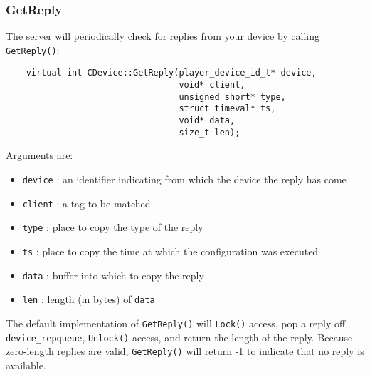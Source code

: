 \documentclass[11pt]{report}
\begin{document}
\subsubsection{GetReply}
The server will periodically check for replies from your device by calling
{\tt GetReply()}:
\begin{verbatim}
    virtual int CDevice::GetReply(player_device_id_t* device, 
                                  void* client, 
                                  unsigned short* type, 
                                  struct timeval* ts, 
                                  void* data, 
                                  size_t len);
\end{verbatim}
Arguments are:
\begin{itemize}
\item {\tt device} : an identifier indicating from which the device the reply
has come
\item {\tt client} : a tag to be matched 
\item {\tt type} : place to copy the type of the reply
\item {\tt ts} : place to copy the time at which the configuration was executed
\item {\tt data} : buffer into which to copy the reply
\item {\tt len} : length (in bytes) of {\tt data}
\end{itemize}
The default implementation of {\tt GetReply()} will {\tt Lock()} access,
pop a reply off {\tt device\_repqueue}, {\tt Unlock()} access, and return the
length of the reply.  Because zero-length replies are valid, {\tt GetReply()}
will return -1 to indicate that no reply is available.
\end{document}
